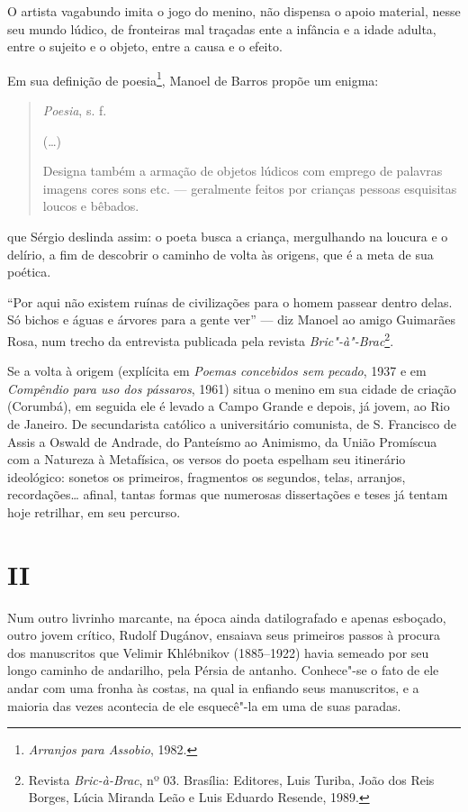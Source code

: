 O artista vagabundo imita o jogo do menino, não dispensa o apoio
material, nesse seu mundo lúdico, de fronteiras mal traçadas ente a
infância e a idade adulta, entre o sujeito e o objeto, entre a causa e o
efeito.

Em sua definição de poesia\footnote{\emph{Arranjos para Assobio}, 1982.}, Manoel
de Barros propõe um enigma:

\begin{quote}
\emph{Poesia}, s. f.

(\ldots{})

Designa também a armação de objetos lúdicos
com emprego de palavras imagens cores sons
etc. --- geralmente feitos por crianças pessoas
esquisitas loucos e bêbados.
\end{quote}

que Sérgio deslinda assim: o poeta busca a criança, mergulhando na
loucura e o delírio, a fim de descobrir o caminho de volta às origens,
que é a meta de sua poética.

``Por aqui não existem ruínas de civilizações para o homem passear
dentro delas. Só bichos e águas e árvores para a gente ver'' --- diz
Manoel ao amigo Guimarães Rosa, num trecho da entrevista publicada pela
revista \emph{Bric"-à"-Brac}\footnote{Revista \emph{Bric-à-Brac}, nº 03. Brasília: Editores,
Luis Turiba, João dos Reis Borges, Lúcia Miranda Leão e Luis Eduardo Resende, 1989.}.

Se a volta à origem (explícita em \emph{Poemas concebidos sem pecado}, 1937 e em \emph{Compêndio para uso dos pássaros}, 1961) situa o menino
em sua cidade de criação (Corumbá), em seguida ele é levado a Campo
Grande e depois, já jovem, ao Rio de Janeiro. De secundarista católico a
universitário comunista, de S. Francisco de Assis a Oswald de Andrade,
do Panteísmo ao Animismo, da União Promíscua com a Natureza à
Metafísica, os versos do poeta espelham seu itinerário ideológico:
sonetos os primeiros, fragmentos os segundos, telas, arranjos,
recordações\ldots{} afinal, tantas formas que numerosas dissertações e teses
já tentam hoje retrilhar, em seu percurso.

\section{II}

Num outro livrinho marcante, na época ainda datilografado e apenas
esboçado, outro jovem crítico, Rudolf Dugánov, ensaiava seus primeiros
passos à procura dos manuscritos que Velimir Khlébnikov (1885--1922)
havia semeado por seu longo caminho de andarilho, pela Pérsia de
antanho. Conhece"-se o fato de ele andar com uma fronha às costas, na
qual ia enfiando seus manuscritos, e a maioria das vezes acontecia de
ele esquecê"-la em uma de suas paradas.

